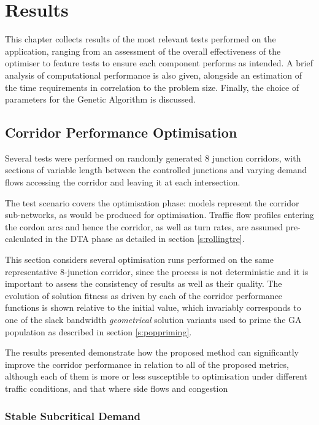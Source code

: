 
\chapter{Results} \label{c:results}

This chapter collects results of the most relevant tests performed on the application, ranging from an assessment of the overall effectiveness of the optimiser to feature tests to ensure each component performs as intended. A brief analysis of computational performance is also given, alongside an estimation of the time requirements in correlation to the problem size. Finally, the choice of parameters for the Genetic Algorithm is discussed.

\section{Corridor Performance Optimisation} \label{r:kpi}
Several tests were performed on randomly generated 8 junction corridors, with sections of variable length between the controlled junctions and varying demand flows accessing the corridor and leaving it at each intersection.

The test scenario covers the optimisation phase: models represent the corridor sub-networks, as would be produced for optimisation. Traffic flow profiles entering the cordon arcs and hence the corridor, as well as turn rates, are assumed pre-calculated in the DTA phase as detailed in section \ref{s:rollingtre}.

This section considers several optimisation runs performed on the same representative 8-junction corridor, since the process is not deterministic and it is important to assess the consistency of results as well as their quality. The evolution of solution fitness as driven by each of the corridor performance functions is shown relative to the initial value, which invariably corresponds to one of the slack bandwidth \emph{geometrical} solution variants used to prime the GA population as described in section \ref{s:poppriming}.

The results presented demonstrate how the proposed method can significantly improve the corridor performance in relation to all of the proposed metrics, although each of them is more or less susceptible to optimisation under different traffic conditions, and that where side flows and congestion 

\subsection{Stable Subcritical Demand}

